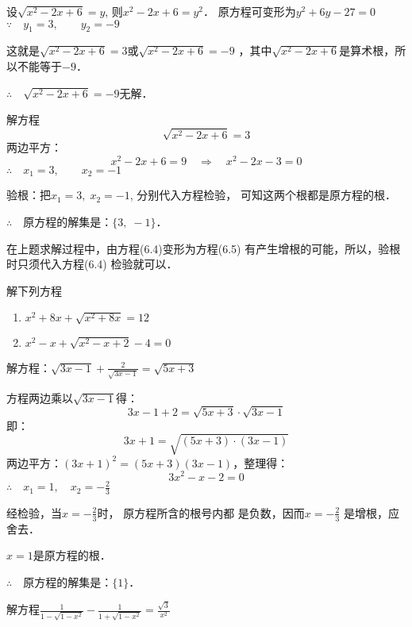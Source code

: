 \begin{solution}
    设$\sqrt{x^2-2x+6}=y$, 则$x^2-2x+6=y^2$．
原方程可变形为$y^2+6y-27=0$
$\because\quad y_1=3,\qquad y_2=-9$

这就是$\sqrt{x^2-2x+6}=3$或$\sqrt{x^2-2x+6}=-9$
，其中$\sqrt{x^2-2x+6}$是算术根，所以不能等于$-9$．

$\therefore\quad \sqrt{x^2-2x+6}=-9$无解．

解方程
\begin{equation}
    \sqrt{x^2-2x+6}=3
\end{equation}
两边平方：
\begin{equation}
    x^2-2x+6=9 \quad \Rightarrow\quad  x^2-2x-3=0
\end{equation}
$\therefore\quad x_1=3,\qquad x_2=-1$

验根：把$x_1=3,\; x_2=-1$, 分别代入方程检验，
可知这两个根都是原方程的根．

$\therefore\quad $原方程的解集是：$\{3,\;-1\}$．
\end{solution}

在上题求解过程中，由方程(6.4)变形为方程(6.5)
有产生增根的可能，所以，验根时只须代入方程(6.4)
检验就可以．

\begin{ex}
    解下列方程
    \begin{enumerate}
        \item $x^2+8x+\sqrt{x^2+8x}=12$
        \item $x^2-x+\sqrt{x^2-x+2}-4=0$
    \end{enumerate}
\end{ex}

\begin{example}
    解方程：$\sqrt{3x-1}+\frac{2}{\sqrt{3x-1}}=\sqrt{5x+3}$
\end{example}

\begin{solution}
    方程两边乘以$\sqrt{3x-1}$得：
\[3x-1+2=\sqrt{5x+3}\cdot \sqrt{3x-1} \]
即：
\[3x+1=\sqrt{(5x+3)\cdot (3x-1)}\]
两边平方：$(3x+1)^2=(5x+3)  (3x-1)$，整理得：
\[3x^2-x-2=0 \]
$\therefore\quad x_1=1,\quad x_2=-\frac{2}{3}$

经检验，当$x=-\frac{2}{3}$时，
原方程所含的根号内都
是负数，因而$x=-\frac{2}{3}$
是增根，应舍去．

$x=1$是原方程的根．

$\therefore\quad $原方程的解集是：$\{1\}$．
\end{solution}

\begin{example}
    解方程$\frac{1}{1-\sqrt{1-x^2}}-\frac{1}{1+\sqrt{1-x^2}}=\frac{\sqrt{3}}{x^2}$
\end{example}

